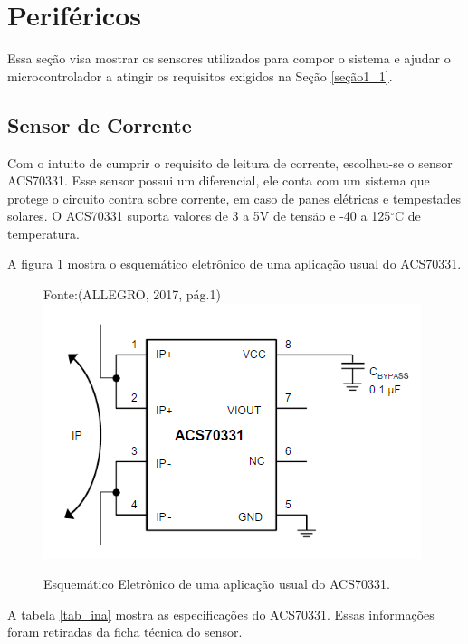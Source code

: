 \section{Periféricos}

Essa seção visa mostrar os sensores utilizados para compor o sistema e ajudar o microcontrolador a atingir os requisitos exigidos na Seção \ref{seção1_1}.

\subsection{Sensor de Corrente}

Com o intuito de cumprir o requisito de leitura de corrente, escolheu-se o sensor ACS70331. Esse sensor possui um diferencial, ele conta com um sistema que protege o circuito contra sobre corrente, em caso de panes elétricas e tempestades solares. O ACS70331 suporta valores de 3 a 5V de tensão e -40 a 125$^{\circ}$C de temperatura.

A figura \ref{fig20} mostra o esquemático eletrônico de uma aplicação usual do ACS70331.



\begin{figure}[h]
	\centering
	Fonte:(ALLEGRO, 2017, pág.1)\linebreak
	\includegraphics[keepaspectratio=true,scale=0.52]{figuras/currentSensor.PNG}
	\caption{Esquemático Eletrônico de uma aplicação usual do ACS70331.}
	\label{fig20}
\end{figure}
\FloatBarrier
A tabela \ref{tab_ina} mostra as especificações do ACS70331. Essas informações foram retiradas da ficha técnica do sensor.

